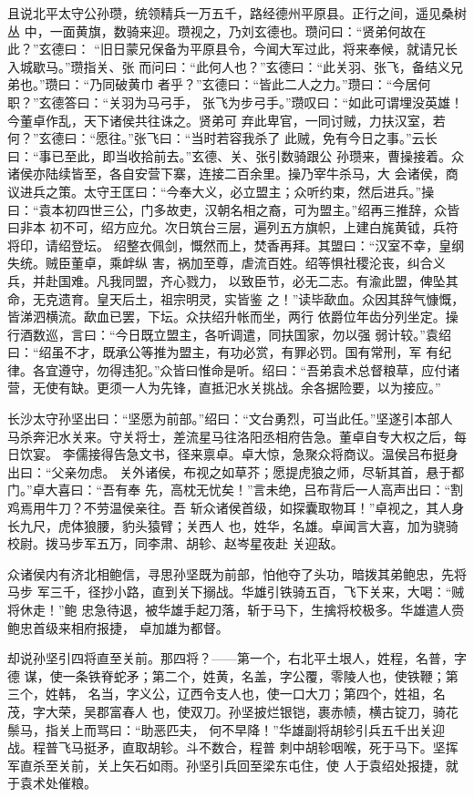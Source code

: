 且说北平太守公孙瓒，统领精兵一万五千，路经德州平原县。正行之间，遥见桑树丛
中，一面黄旗，数骑来迎。瓒视之，乃刘玄德也。瓒问曰：“贤弟何故在此？”玄德曰：
“旧日蒙兄保备为平原县令，今闻大军过此，将来奉候，就请兄长入城歇马。”瓒指关、张
而问曰：“此何人也？”玄德曰：“此关羽、张飞，备结义兄弟也。”瓒曰：“乃同破黄巾
者乎？”玄德曰：“皆此二人之力。”瓒曰：“今居何职？”玄德答曰：“关羽为马弓手，
张飞为步弓手。”瓒叹曰：“如此可谓埋没英雄！今董卓作乱，天下诸侯共往诛之。贤弟可
弃此卑官，一同讨贼，力扶汉室，若何？”玄德曰：“愿往。”张飞曰：“当时若容我杀了
此贼，免有今日之事。”云长曰：“事已至此，即当收拾前去。”玄德、关、张引数骑跟公
孙瓒来，曹操接着。众诸侯亦陆续皆至，各自安营下寨，连接二百余里。操乃宰牛杀马，大
会诸侯，商议进兵之策。太守王匡曰：“今奉大义，必立盟主；众听约束，然后进兵。”操
曰：“袁本初四世三公，门多故吏，汉朝名相之裔，可为盟主。”绍再三推辞，众皆曰非本
初不可，绍方应允。次日筑台三层，遍列五方旗帜，上建白旄黄钺，兵符将印，请绍登坛。
绍整衣佩剑，慨然而上，焚香再拜。其盟曰：“汉室不幸，皇纲失统。贼臣董卓，乘衅纵
害，祸加至尊，虐流百姓。绍等惧社稷沦丧，纠合义兵，并赴国难。凡我同盟，齐心戮力，
以致臣节，必无二志。有渝此盟，俾坠其命，无克遗育。皇天后土，祖宗明灵，实皆鉴
之！”读毕歃血。众因其辞气慷慨，皆涕泗横流。歃血已罢，下坛。众扶绍升帐而坐，两行
依爵位年齿分列坐定。操行酒数巡，言曰：“今日既立盟主，各听调遣，同扶国家，勿以强
弱计较。”袁绍曰：“绍虽不才，既承公等推为盟主，有功必赏，有罪必罚。国有常刑，军
有纪律。各宜遵守，勿得违犯。”众皆曰惟命是听。绍曰：“吾弟袁术总督粮草，应付诸
营，无使有缺。更须一人为先锋，直抵汜水关挑战。余各据险要，以为接应。”

长沙太守孙坚出曰：“坚愿为前部。”绍曰：“文台勇烈，可当此任。”坚遂引本部人
马杀奔汜水关来。守关将士，差流星马往洛阳丞相府告急。董卓自专大权之后，每日饮宴。
李儒接得告急文书，径来禀卓。卓大惊，急聚众将商议。温侯吕布挺身出曰：“父亲勿虑。
关外诸侯，布视之如草芥；愿提虎狼之师，尽斩其首，悬于都门。”卓大喜曰：“吾有奉
先，高枕无忧矣！”言未绝，吕布背后一人高声出曰：“割鸡焉用牛刀？不劳温侯亲往。吾
斩众诸侯首级，如探囊取物耳！”卓视之，其人身长九尺，虎体狼腰，豹头猿臂；关西人
也，姓华，名雄。卓闻言大喜，加为骁骑校尉。拨马步军五万，同李肃、胡轸、赵岑星夜赴
关迎敌。

众诸侯内有济北相鲍信，寻思孙坚既为前部，怕他夺了头功，暗拨其弟鲍忠，先将马步
军三千，径抄小路，直到关下搦战。华雄引铁骑五百，飞下关来，大喝：“贼将休走！”鲍
忠急待退，被华雄手起刀落，斩于马下，生擒将校极多。华雄遣人赍鲍忠首级来相府报捷，
卓加雄为都督。

却说孙坚引四将直至关前。那四将？——第一个，右北平土垠人，姓程，名普，字德
谋，使一条铁脊蛇矛；第二个，姓黄，名盖，字公覆，零陵人也，使铁鞭；第三个，姓韩，
名当，字义公，辽西令支人也，使一口大刀；第四个，姓祖，名茂，字大荣，吴郡富春人
也，使双刀。孙坚披烂银铠，裹赤帻，横古锭刀，骑花鬃马，指关上而骂曰：“助恶匹夫，
何不早降！”华雄副将胡轸引兵五千出关迎战。程普飞马挺矛，直取胡轸。斗不数合，程普
刺中胡轸咽喉，死于马下。坚挥军直杀至关前，关上矢石如雨。孙坚引兵回至梁东屯住，使
人于袁绍处报捷，就于袁术处催粮。

